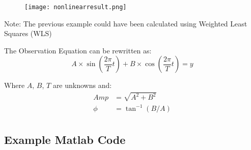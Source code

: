 


\begin{figure}[H]
	\centering
	\texttt{[image: nonlinearresult.png]}
\end{figure}

Note: The previous example could have been calculated using Weighted Least Squares (WLS)

The Observation Equation can be rewritten as:
\[
A \times \sin(\dfrac{2\pi}{T}t) + B \times \cos(\dfrac{2\pi}{T}t) = y
\]

Where $A$, $B$, $T$ are unknowns and:
\begin{align*}
	Amp &= \sqrt{A^2+B^2}\\
	\phi &= \tan^{-1}(B/A)\\
\end{align*}
\clearpage



\subsection{Example Matlab Code}



